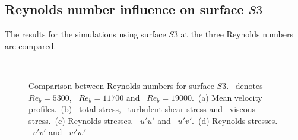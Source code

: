 \subsection{Reynolds number influence on surface $S3$}\label{subsec: Reynolds comp S3}

The results for the simulations using surface $S3$ at the three Reynolds numbers are compared.
\begin{figure}
    \centering
    \begin{subfigure}{0.495\textwidth}
        \centering
        \subcaption{}
        
        \label{subfig: Reynolds comp S3 velocity}
    \end{subfigure}
    \hfill
    \begin{subfigure}{0.495\textwidth}
        \centering
        \subcaption{}
        
        \label{subfig: Reynolds comp S3 total stress}
    \end{subfigure}
    \plotverticalspacing
    \begin{subfigure}{0.495\textwidth}
        \centering
        \subcaption{}
        
        \label{subfig: Reynolds comp S3 Reynolds stresses uu}
    \end{subfigure}
    \hfill
    \begin{subfigure}{0.495\textwidth}
        \centering
        \subcaption{}
        
        \label{subfig: Reynolds comp S3 Reynolds stresses vv}
    \end{subfigure} 
    \\[-10pt]  
    \caption[Comparison of surface $S3$ with different Reynolds numbers]{Comparison between Reynolds numbers for surface $S3$.  \sThreeFiveThreeSymbol\ denotes $Re_b = 5300$, \sThreeElevenSevenSymbol \ $Re_b = 11700$ and \sThreeNineteenSymbol\ $Re_b = 19000$.~(a) Mean velocity profiles.~(b) \lsTotalStressSymbol \ total stress, \lsReynoldsStressSymbol \ turbulent shear stress and \lsViscousStressSymbol \ viscous stress.~(c) Reynolds stresses. \lsRuuSymbol \ $u'u'$ and \lsRuvSymbol \ $u'v'$.~(d) Reynolds stresses. \lsRvvSymbol \ $v'v'$ and \lsRwwSymbol \ $w'w'$}
    \label{fig: results Reynolds comparison S3}
\end{figure}

